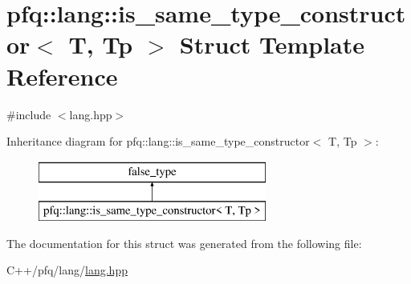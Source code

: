\hypertarget{structpfq_1_1lang_1_1is__same__type__constructor}{\section{pfq\+:\+:lang\+:\+:is\+\_\+same\+\_\+type\+\_\+constructor$<$ T, Tp $>$ Struct Template Reference}
\label{structpfq_1_1lang_1_1is__same__type__constructor}
}


{\ttfamily \#include $<$lang.\+hpp$>$}

Inheritance diagram for pfq\+:\+:lang\+:\+:is\+\_\+same\+\_\+type\+\_\+constructor$<$ T, Tp $>$\+:\begin{figure}[H]
\begin{center}
\leavevmode
\includegraphics[height=2.000000cm]{structpfq_1_1lang_1_1is__same__type__constructor}
\end{center}
\end{figure}


The documentation for this struct was generated from the following file\+:\begin{DoxyCompactItemize}
\item 
C++/pfq/lang/\hyperlink{lang_8hpp}{lang.\+hpp}\end{DoxyCompactItemize}
